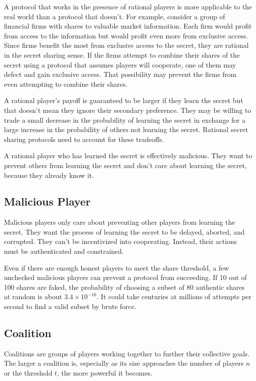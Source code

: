 \documentclass{dalcsthesis}
\begin{document}
A protocol that works in the presence of rational players is more applicable to the real world than a protocol that doesn't. For example, consider a group of financial firms with shares to valuable market information. Each firm would profit from access to the information but would profit even more from exclusive access. Since firms benefit the most from exclusive access to the secret, they are rational in the secret sharing sense. If the firms attempt to combine their shares of the secret using a protocol that assumes players will cooperate, one of them may defect and gain exclusive access. That possibility may prevent the firms from even attempting to combine their shares.

A rational player's payoff is guaranteed to be larger if they learn the secret but that doesn't mean they ignore their secondary preference. They may be willing to trade a small decrease in the probability of learning the secret in exchange for a large increase in the probability of others not learning the secret. Rational secret sharing protocols need to account for these tradeoffs.

A rational player who has learned the secret is effectively malicious. They want to prevent others from learning the secret and don't care about learning the secret, because they already know it.

\subsection{Malicious Player}

Malicious players only care about preventing other players from learning the secret. They want the process of learning the secret to be delayed, aborted, and corrupted. They can't be incentivized into cooperating. Instead, their actions must be authenticated and constrained.

Even if there are enough honest players to meet the share threshold, a few unchecked malicious players can prevent a protocol from succeeding. If 10 out of 100 shares are faked, the probability of choosing a subset of 80 authentic shares at random is about $3.4 \times 10^{-16}$. It could take centuries at millions of attempts per second to find a valid subset by brute force.

\subsection{Coalition}

Coalitions are groups of players working together to further their collective goals. The larger a coalition is, especially as its size approaches the number of players $n$ or the threshold $t$, the more powerful it becomes.
\end{document}
